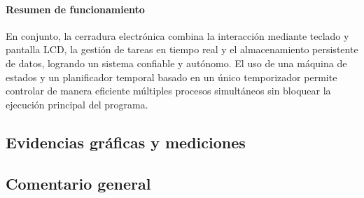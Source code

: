 \vspace{1em}

\paragraph*{Resumen de funcionamiento}

En conjunto, la cerradura electrónica combina la interacción mediante teclado y pantalla LCD, la gestión de tareas en tiempo real y el almacenamiento persistente de datos, logrando un sistema confiable y autónomo. El uso de una máquina de estados y un planificador temporal basado en un único temporizador permite controlar de manera eficiente múltiples procesos simultáneos sin bloquear la ejecución principal del programa.








\subsection{Evidencias gráficas y mediciones}


\subsection{Comentario general}

